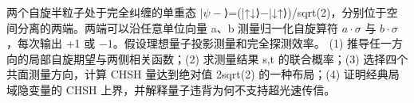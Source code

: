 两个自旋半粒子处于完全纠缠的单重态 \(|\psi -\)⟩=(|↑↓⟩\(-|\)↓↑⟩)/sqrt(2)，分别位于空间分离的两端。两端可以沿任意单位向量 a、b 测量归一化自旋算符 \(a\cdot \sigma \) 与 \(b\cdot \sigma \)，每次输出 +1 或 \(-1\)。假设理想量子投影测量和完全探测效率。
(1) 推导任一方向的局部自旋期望与两侧相关函数；(2) 求测量结果 s,t 的联合概率；(3) 选择四个共面测量方向，计算 CHSH 量达到绝对值 2sqrt(2) 的一种布局；(4) 证明经典局域隐变量的 CHSH 上界，并解释量子违背为何不支持超光速传信。
